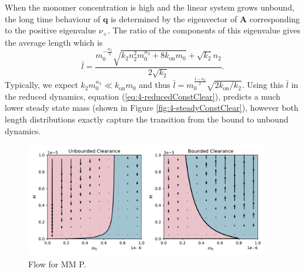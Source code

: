 When the monomer concentration is high and the linear system grows unbound, the long time behaviour of $\mathbf{q}$ is determined by the eigenvector of $\mathbf{A}$ corresponding to the positive eigenvalue $\nu_+$. The ratio of the components of this eigenvalue gives the average length which is
\begin{equation}
    \bar{l} = \frac{m_0^{-\frac{n_2}{2}} \sqrt{k_2 n_2^2 m_0^{n_2}+8 k_\text{on} m_0}+\sqrt{k_2} n_2}{2 \sqrt{k_2}}.
\end{equation}
Typically, we expect $k_2 m_0^{n_2} \ll k_\text{on} m_0$ and thus $\bar{l} = m_0^{\frac{1-n_2}{2}}\sqrt{2 k_\text{on}/k_2}$. Using this $\bar{l}$ in the reduced dynamics, equation (\ref{eq:4-reducedConstClear}), predicts a much lower steady state mass (shown in Figure \ref{fig:4-steadyConstClear}), however both length distributions exactly capture the transition from the bound to unbound dynamics.
\begin{figure}
    \centering
    \includegraphics[width=0.95\textwidth]{figures/4-agg-figs/reduced_nocol.pdf}
    \caption{Flow for MM P.}
    \label{fig:4-flowMM_P}
\end{figure}

